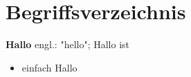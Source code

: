 
\chapter{Begriffsverzeichnis}

\textbf{Hallo} engl.: "hello"; Hallo ist
\begin{itemize}
\item einfach Hallo


\end{itemize}

\endinput